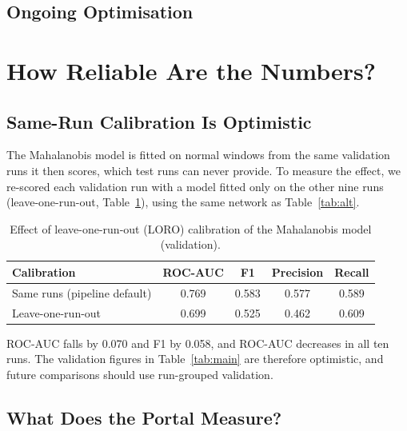 \documentclass[runningheads]{llncs}
\newif\ifshowplaceholders
\newcommand{\placeholder}[1]{\ifshowplaceholders\textcolor{red}{\textbf{[#1]}}\fi}
\newcommand{\finalResults}{\placeholder{FINAL EXPERIMENT RESULTS TO BE UPDATED}}
\begin{document}
\subsection{Ongoing Optimisation}

\finalResults

\section{How Reliable Are the Numbers?}\label{sec:reliability}

\subsection{Same-Run Calibration Is Optimistic}

The Mahalanobis model is fitted on normal windows from the same validation runs it then scores, which test runs can never provide. To measure the effect, we re-scored each validation run with a model fitted only on the other nine runs (leave-one-run-out, Table~\ref{tab:loro}), using the same network as Table~\ref{tab:alt}.

\begin{table}[ht]
\centering
\caption{Effect of leave-one-run-out (LORO) calibration of the Mahalanobis model (validation).}\label{tab:loro}
\begin{tabular}{lcccc}
\toprule
Calibration & ROC-AUC & F1 & Precision & Recall \\
\midrule
Same runs (pipeline default) & 0.769 & 0.583 & 0.577 & 0.589 \\
Leave-one-run-out & 0.699 & 0.525 & 0.462 & 0.609 \\
\bottomrule
\end{tabular}
\end{table}

ROC-AUC falls by 0.070 and F1 by 0.058, and ROC-AUC decreases in all ten runs. The validation figures in Table~\ref{tab:main} are therefore optimistic, and future comparisons should use run-grouped validation.

\subsection{What Does the Portal Measure?}\label{sec:portal}
\end{document}
